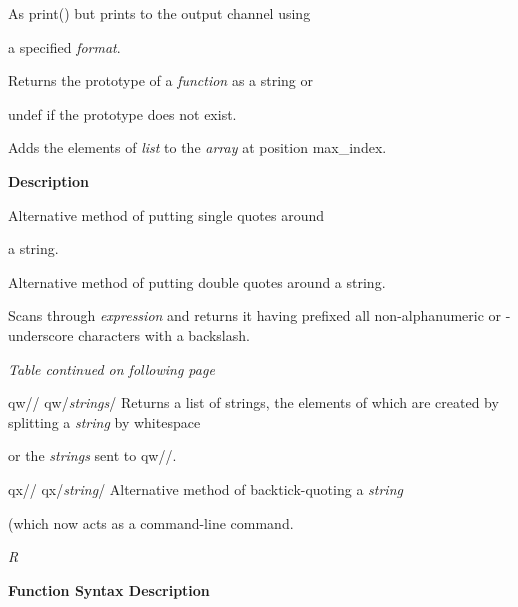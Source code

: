 \documentclass[a4paper,11pt]{book}
\begin{document}
\noindent 

\noindent As print() but prints to the output channel using

\noindent a specified \textit{format}.

\noindent 

\noindent 

\noindent Returns the prototype of a \textit{function }as a string or

\noindent undef if the prototype does not exist.

\noindent 

\noindent Adds the elements of \textit{list }to the \textit{array }at position max\_index.

\noindent 

\noindent 

\noindent 

\noindent 

\noindent \textbf{Description}

\noindent 

\noindent Alternative method of putting single quotes around

\noindent a string.

\noindent 

\noindent Alternative method of putting double quotes around a string.

\noindent 

\noindent Scans through \textit{expression }and returns it having prefixed all non-alphanumeric or  -underscore characters with a backslash.

\noindent \textit{Table continued on following page}

\noindent 

\noindent qw// qw/\textit{strings}/ Returns a list of strings, the elements of which are created by splitting a \textit{string }by whitespace

\noindent or the \textit{strings }sent to qw//.

\noindent qx// qx/\textit{string}/ Alternative method of backtick-quoting a \textit{string}

\noindent (which now acts as a command-line command.

\noindent 

\noindent 

\noindent \textit{R}

\noindent 

\noindent \textbf{Function Syntax Description}

\noindent 
\end{document}
